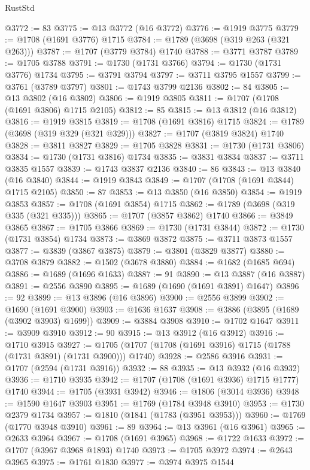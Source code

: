 \begin{lexlean}{RustStd}
\begin{coremodule}
@3772 := 83
@3775 := @13 @3772 (@16 @3772)
@3776 := @1919 @3775
@3779 := @1708 (@1691 @3776) @1715
@3784 := @1789 (@3698 (@319 @263 (@321 @263)))
@3787 := @1707 (@3779 @3784) @1740
@3788 := @3771 @3787
@3789 := @1705 @3788
@3791 := @1730 (@1731 @3766)
@3794 := @1730 (@1731 @3776) @1734
@3795 := @3791 @3794
@3797 := @3711 @3795 @1557
@3799 := @3761 (@3789 @3797)
@3801 := @1743 @3799 @2136
@3802 := 84
@3805 := @13 @3802 (@16 @3802)
@3806 := @1919 @3805
@3811 := @1707 (@1708 (@1691 @3806) @1715 @2105)
@3812 := 85
@3815 := @13 @3812 (@16 @3812)
@3816 := @1919 @3815
@3819 := @1708 (@1691 @3816) @1715
@3824 := @1789 (@3698 (@319 @329 (@321 @329)))
@3827 := @1707 (@3819 @3824) @1740
@3828 := @3811 @3827
@3829 := @1705 @3828
@3831 := @1730 (@1731 @3806)
@3834 := @1730 (@1731 @3816) @1734
@3835 := @3831 @3834
@3837 := @3711 @3835 @1557
@3839 := @1743 @3837 @2136
@3840 := 86
@3843 := @13 @3840 (@16 @3840)
@3844 := @1919 @3843
@3849 := @1707 (@1708 (@1691 @3844) @1715 @2105)
@3850 := 87
@3853 := @13 @3850 (@16 @3850)
@3854 := @1919 @3853
@3857 := @1708 (@1691 @3854) @1715
@3862 := @1789 (@3698 (@319 @335 (@321 @335)))
@3865 := @1707 (@3857 @3862) @1740
@3866 := @3849 @3865
@3867 := @1705 @3866
@3869 := @1730 (@1731 @3844)
@3872 := @1730 (@1731 @3854) @1734
@3873 := @3869 @3872
@3875 := @3711 @3873 @1557
@3877 := @3839 (@3867 @3875)
@3879 := @3801 (@3829 @3877)
@3880 := @3708 @3879
@3882 := @1502 (@3678 @3880)
@3884 := @1682 (@1685 @694)
@3886 := @1689 (@1696 @1633)
@3887 := 91
@3890 := @13 @3887 (@16 @3887)
@3891 := @2556 @3890
@3895 := @1689 (@1690 (@1691 @3891) @1647)
@3896 := 92
@3899 := @13 @3896 (@16 @3896)
@3900 := @2556 @3899
@3902 := @1690 (@1691 @3900)
@3903 := @1636 @1637
@3908 := @3886 (@3895 (@1689 (@3902 @3903) @1699))
@3909 := @3884 @3908
@3910 := @1702 @1647
@3911 := @3909 @3910
@3912 := 90
@3915 := @13 @3912 (@16 @3912)
@3916 := @1710 @3915
@3927 := @1705 (@1707 (@1708 (@1691 @3916) @1715 (@1788 (@1731 @3891) (@1731 @3900))) @1740)
@3928 := @2586 @3916
@3931 := @1707 (@2594 (@1731 @3916))
@3932 := 88
@3935 := @13 @3932 (@16 @3932)
@3936 := @1710 @3935
@3942 := @1707 (@1708 (@1691 @3936) @1715 @1777) @1740
@3944 := @1705 (@3931 @3942)
@3946 := @1806 (@3014 @3936)
@3948 := @1590 @1647 @3903
@3951 := @1769 (@1784 @3948 @3910)
@3953 := @1730 @2379 @1734
@3957 := @1810 (@1841 (@1783 (@3951 @3953)))
@3960 := @1769 (@1770 @3948 @3910)
@3961 := 89
@3964 := @13 @3961 (@16 @3961)
@3965 := @2633 @3964
@3967 := @1708 (@1691 @3965)
@3968 := @1722 @1633
@3972 := @1707 (@3967 @3968 @1893) @1740
@3973 := @1705 @3972
@3974 := @2643 @3965
@3975 := @1761 @1830
@3977 := @3974 @3975 @1544

\end{coremodule}
\end{lexlean}
